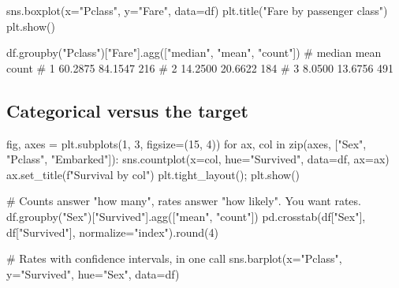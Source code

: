 \documentclass[11pt,a4paper]{article}
\begin{document}
\begin{py}
sns.boxplot(x="Pclass", y="Fare", data=df)
plt.title("Fare by passenger class")
plt.show()

df.groupby("Pclass")["Fare"].agg(["median", "mean", "count"])
#          median     mean  count
# 1        60.2875  84.1547   216
# 2        14.2500  20.6622   184
# 3         8.0500  13.6756   491
\end{py}



\subsection{Categorical versus the target}

\begin{py}
fig, axes = plt.subplots(1, 3, figsize=(15, 4))
for ax, col in zip(axes, ["Sex", "Pclass", "Embarked"]):
    sns.countplot(x=col, hue="Survived", data=df, ax=ax)
    ax.set_title(f"Survival by {col}")
plt.tight_layout(); plt.show()

# Counts answer "how many", rates answer "how likely". You want rates.
df.groupby("Sex")["Survived"].agg(["mean", "count"])
pd.crosstab(df["Sex"], df["Survived"], normalize="index").round(4)

# Rates with confidence intervals, in one call
sns.barplot(x="Pclass", y="Survived", hue="Sex", data=df)
\end{py}
\end{document}
